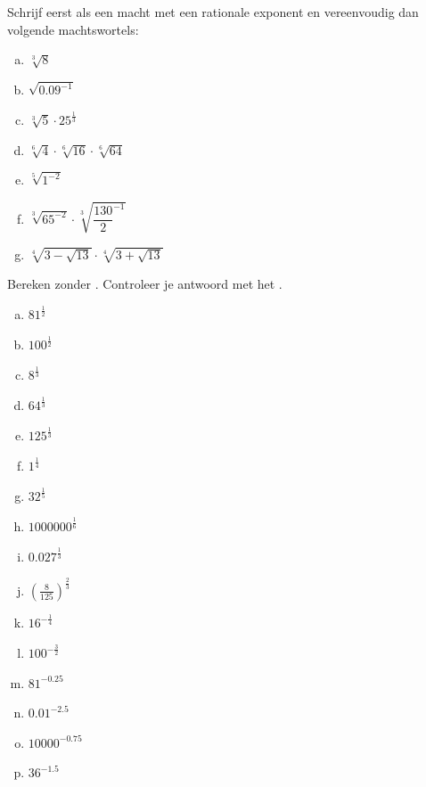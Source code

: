 \documentclass[12pt,twoside,a4paper]{article}
\begin{document}
\begin{oefening}
Schrijf eerst als een macht met een rationale exponent en vereenvoudig dan volgende machtswortels:
\begin{multicols}{2}
\begin{enumerate}[(a)]
  \itemsep.5em
  \item $\sqrt[3]{8}$
  \item $\sqrt{0.09^{-1}}$
  \item $\sqrt[3]{5}\cdot25^{\frac{1}{3}}$
  \item $\sqrt[6]{4}\cdot\sqrt[6]{16}\cdot\sqrt[6]{64}$
  \item $\sqrt[5]{1^{-2}}$
  \item $\sqrt[3]{65^{-2}} \cdot \sqrt[3]{\dfrac{130}{2}^{-1}}$
  \item $\sqrt[4]{3-\sqrt{13}}\cdot\sqrt[4]{3+\sqrt{13}}$
\end{enumerate}
\end{multicols}
\end{oefening}

\begin{oefening}
Bereken zonder . Controleer je antwoord met het .
\begin{multicols}{3}
\begin{enumerate}[(a)]
  \itemsep1em
  \item ${81}^{\frac{1}{2}}$
  \item ${100}^{\frac{1}{2}}$
  \item ${8}^{\frac{1}{3}}$
  \item ${64}^{\frac{1}{3}}$
  \item ${125}^{\frac{1}{3}}$
  \item ${1}^{\frac{1}{4}}$
  \item ${32}^{\frac{1}{5}}$
  \item ${1000000}^{\frac{1}{6}}$
  \item ${0.027}^{\frac{1}{3}}$
  \item $\left(\frac{8}{125}\right)^{\frac{2}{3}}$
  \item ${16}^{-\frac{1}{4}}$
  \item ${100}^{-\frac{3}{2}}$
  \item ${81}^{-0.25}$
  \item ${0.01}^{-2.5}$
  \item ${10000}^{-0.75}$
  \item ${36}^{-1.5}$
\end{enumerate}
\end{multicols}
\end{oefening}
\end{document}
